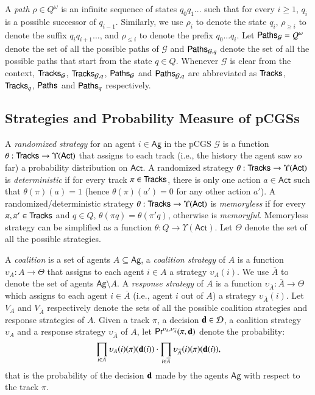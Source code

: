\documentclass[letterpaper]{article}
\newcommand{\calM}{\mathcal{G}}
\newcommand{\calD}{\mathcal{D}}
\newcommand{\calP}{{\sf Paths}}
\newcommand{\calT}{{\sf Tracks}}
\newcommand{\Ag}{\textsf{Ag}}
\newcommand{\Act}{\textsf{Act}}
\newcommand{\Prb}{\textsf{Pr}}
\newcommand{\nA}{\overline{A}}
\newcommand{\dec}{{\bf d}}
\begin{document}
A \emph{path} $\rho\in Q^\omega$ is an infinite sequence of states $q_0q_1...$ such that for every $i\geq 1$, $q_i$ is a possible successor of $q_{i-1}$. Similarly, we use $\rho_i$ to denote the state $q_i$, $\rho_{\geq i}$ to denote the suffix $q_iq_{i+1}...$, and $\rho_{\leq i}$ to denote the prefix $q_0...q_{i}$.
Let $\calP_\calM=Q^\omega$ denote the set of all the possible paths
of $\calM$ and $\calP_{\calM,q}$ denote the set of all the possible paths that start from the state $q\in Q$.
Whenever $\calM$ is clear from the context,  $\calT_{\calM}$, $\calT_{\calM,q}$, $\calP_{\calM}$ and $\calP_{\calM,q}$ are abbreviated as $\calT$, $\calT_{q}$, $\calP$ and $\calP_{q}$ respectively.


\subsection{Strategies and Probability Measure of pCGSs}
A \emph{randomized strategy} for an agent $i\in\Ag$ in the pCGS $\calM$ is a function $\theta:\calT\rightarrow \Upsilon(\Act)$ that assigns to each track (i.e., the history the agent saw so far) a probability distribution on $\Act$. A randomized strategy $\theta:\calT\rightarrow \Upsilon(\Act)$ is \emph{deterministic} if for every track $\pi\in\calT$, there is only one action $a\in\Act$ such that $\theta(\pi)(a)=1$ (hence $\theta(\pi)(a')=0$ for any other action $a'$).
A randomized/deterministic strategy $\theta:\calT\rightarrow \Upsilon(\Act)$ is \emph{memoryless} if for every $\pi,\pi'\in\calT$ and $q\in Q$, $\theta(\pi q)=\theta(\pi' q)$, otherwise is \emph{memoryful}. Memoryless strategy can be simplified as a function $\theta:Q\rightarrow \Upsilon(\Act)$.
Let $\Theta$ denote the set of all the possible strategies.

A \emph{coalition} is a set of agents $A\subseteq \Ag$, a \emph{coalition strategy} of $A$
is a function $\upsilon_A: A \rightarrow \Theta$ that assigns to each agent $i\in A$ a strategy $\upsilon_A(i)$.
We use $\nA$ to denote the set of agents $\Ag\setminus A$. A \emph{response strategy} of $A$ is a function $\upsilon_{\nA}: \nA \rightarrow \Theta$ which assigns to each agent $i\in\nA$ (i.e., agent $i$ out of $A$) a strategy $\upsilon_{\nA}(i)$.
Let $V_A$ and $V_{\nA}$ respectively denote the sets of all the possible coalition strategies and response strategies of $A$.
Given a track $\pi$, a decision $\dec\in\calD$, a coalition strategy $\upsilon_A$ and a response strategy $\upsilon_{\nA}$ of $A$,
let $\Prb^{\upsilon_A,\upsilon_{\nA}}(\pi,\dec)$ denote the probability:
\[\prod_{i\in A}\upsilon_A(i)(\pi)(\dec(i))\cdot \prod_{i\in \nA}\upsilon_{\nA}(i)(\pi)(\dec(i)),\]
that is the probability of the decision $\dec$ made by the agents $\Ag$ with respect to the track $\pi$.
\end{document}
